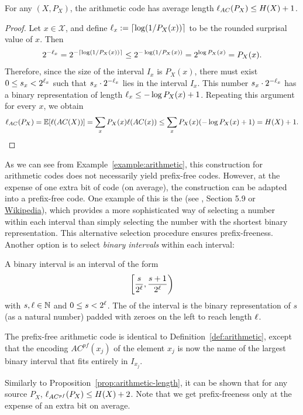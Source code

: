 \begin{proposition}\label{prop:arithmetic-length}
For any $(X,P_X)$, the arithmetic code has average length $\ell_{AC}(P_X) \leq H(X) + 1$.
\end{proposition}
\begin{proof}
Let $x \in \mathcal{X}$, and define $\ell_x := \lceil \log (1/P_X(x))\rceil$ to be the rounded surprisal value of $x$. Then
\begin{align}
2^{-\ell_x} = 2^{-\lceil \log (1/P_X(x))\rceil} \leq 2^{-\log (1/P_X(x))} = 2^{\log P_X(x)} = P_X(x).
\end{align}
Therefore, since the size of the interval $I_x$ is $P_X(x)$, there must exist $0 \leq s_x < 2^{\ell_x}$ such that $s_x \cdot 2^{-\ell_x}$ lies in the interval $I_x$. This number $s_x \cdot 2^{-\ell_x}$ has a binary representation of length $\ell_x \leq -\log P_X(x) + 1$. Repeating this argument for every $x$, we obtain
\begin{align}
\ell_{AC}(P_X) = \mathbb{E}[\ell(AC(X))] = \sum_x P_X(x) \ell(AC(x)) \leq \sum_x P_X(x) (-\log P_X(x) + 1) = H(X) + 1.
\end{align}
\end{proof}

As we can see from Example~\ref{example:arithmetic}, this construction for arithmetic codes does not necessarily yield prefix-free codes. However, at the expense of one extra bit of code (on average), the construction can be adapted into a prefix-free code. One example of this is the  (see \CT, Section 5.9 or \href{https://en.wikipedia.org/wiki/Shannon%E2%80%93Fano%E2%80%93Elias_coding}{Wikipedia}), which provides a more sophisticated way of selecting a number within each interval than simply selecting the number with the shortest binary representation. This alternative selection procedure ensures prefix-freeness. Another option is to select \emph{binary intervals} within each interval:

\begin{definition}
A binary interval is an interval of the form
\[
\left[\frac{s}{2^{\ell}}, \frac{s+1}{2^{\ell}}\right)
\]
with $s, \ell \in \mathbb{N}$ and $0 \leq s < 2^{\ell}$. The  of the interval is the binary representation of $s$ (as a natural number) padded with zeroes on the left to reach length $\ell$.
\end{definition}

\begin{definition}
The prefix-free arithmetic code is identical to Definition~\ref{def:arithmetic}, except that the encoding $AC^{pf}(x_j)$ of the element $x_j$ is now the name of the largest binary interval that fits entirely in $I_{x_j}$.
\end{definition}
Similarly to Proposition~\ref{prop:arithmetic-length}, it can be shown that for any source  $P_X$, $\ell_{AC^{pf}}(P_X) \leq H(X) + 2$. Note that we get prefix-freeness only at the expense of an extra bit on average.

